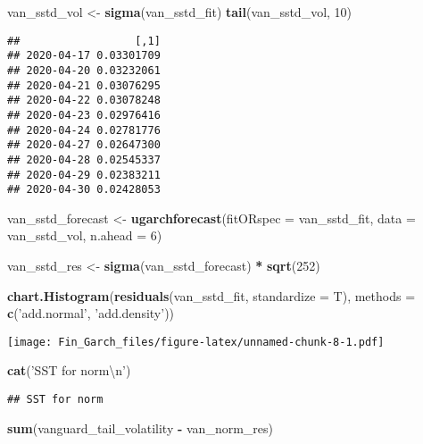 \documentclass[]{article}
\newenvironment{Shaded}{\begin{snugshade}}{\end{snugshade}}
\newcommand{\CharTok}[1]{\textcolor[rgb]{0.31,0.60,0.02}{#1}}
\newcommand{\DataTypeTok}[1]{\textcolor[rgb]{0.13,0.29,0.53}{#1}}
\newcommand{\DecValTok}[1]{\textcolor[rgb]{0.00,0.00,0.81}{#1}}
\newcommand{\KeywordTok}[1]{\textcolor[rgb]{0.13,0.29,0.53}{\textbf{#1}}}
\newcommand{\NormalTok}[1]{#1}
\newcommand{\OperatorTok}[1]{\textcolor[rgb]{0.81,0.36,0.00}{\textbf{#1}}}
\newcommand{\StringTok}[1]{\textcolor[rgb]{0.31,0.60,0.02}{#1}}
\begin{document}
\begin{Shaded}
\begin{Highlighting}[]
\NormalTok{van_sstd_vol <-}\StringTok{ }\KeywordTok{sigma}\NormalTok{(van_sstd_fit)}
\KeywordTok{tail}\NormalTok{(van_sstd_vol, }\DecValTok{10}\NormalTok{)}
\end{Highlighting}
\end{Shaded}

\begin{verbatim}
##                  [,1]
## 2020-04-17 0.03301709
## 2020-04-20 0.03232061
## 2020-04-21 0.03076295
## 2020-04-22 0.03078248
## 2020-04-23 0.02976416
## 2020-04-24 0.02781776
## 2020-04-27 0.02647300
## 2020-04-28 0.02545337
## 2020-04-29 0.02383211
## 2020-04-30 0.02428053
\end{verbatim}

\begin{Shaded}
\begin{Highlighting}[]
\NormalTok{van_sstd_forecast <-}\StringTok{ }\KeywordTok{ugarchforecast}\NormalTok{(}\DataTypeTok{fitORspec =}\NormalTok{ van_sstd_fit,}
                                    \DataTypeTok{data =}\NormalTok{ van_sstd_vol, }\DataTypeTok{n.ahead =} \DecValTok{6}\NormalTok{)}

\NormalTok{van_sstd_res <-}\StringTok{ }\KeywordTok{sigma}\NormalTok{(van_sstd_forecast) }\OperatorTok{*}\StringTok{ }\KeywordTok{sqrt}\NormalTok{(}\DecValTok{252}\NormalTok{)}

\KeywordTok{chart.Histogram}\NormalTok{(}\KeywordTok{residuals}\NormalTok{(van_sstd_fit, }\DataTypeTok{standardize =}\NormalTok{ T),}
                \DataTypeTok{methods =} \KeywordTok{c}\NormalTok{(}\StringTok{'add.normal'}\NormalTok{, }\StringTok{'add.density'}\NormalTok{))}
\end{Highlighting}
\end{Shaded}

\texttt{[image: Fin\_Garch\_files/figure-latex/unnamed-chunk-8-1.pdf]}

\begin{Shaded}
\begin{Highlighting}[]
\KeywordTok{cat}\NormalTok{(}\StringTok{'SST for norm}\CharTok{\textbackslash{}n}\StringTok{'}\NormalTok{)}
\end{Highlighting}
\end{Shaded}

\begin{verbatim}
## SST for norm
\end{verbatim}

\begin{Shaded}
\begin{Highlighting}[]
\KeywordTok{sum}\NormalTok{(vanguard_tail_volatility }\OperatorTok{-}\StringTok{ }\NormalTok{van_norm_res)}
\end{Highlighting}
\end{Shaded}
\end{document}
